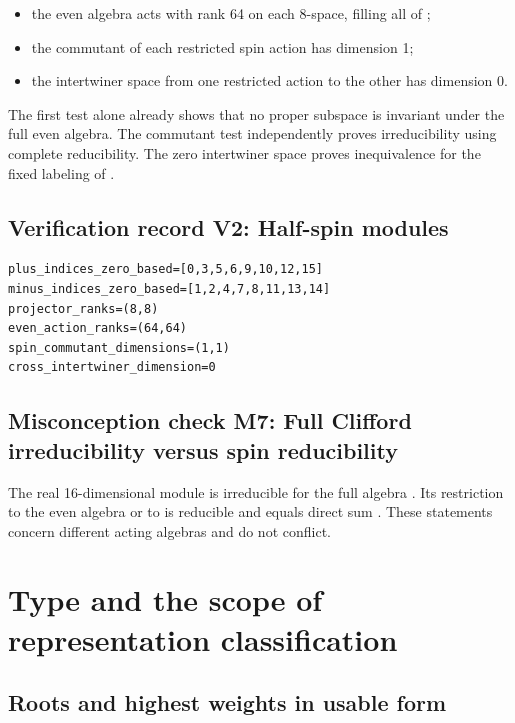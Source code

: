 \documentclass[11pt]{article}
\begin{document}
\begin{itemize}
\item the even algebra acts with rank 64 on each 8-space, filling all of
\texttt{};

\item the commutant of each restricted spin action has dimension 1;
\item the intertwiner space from one restricted action to the other has dimension
0.

\end{itemize}

The first test alone already shows that no proper subspace is invariant under the full even algebra. The commutant test independently proves irreducibility using complete reducibility. The zero intertwiner space proves inequivalence for the fixed labeling of \texttt{}.

\subsection{Verification record V2: Half-spin modules}

\begin{Verbatim}[fontsize=\small]
plus_indices_zero_based=[0,3,5,6,9,10,12,15]
minus_indices_zero_based=[1,2,4,7,8,11,13,14]
projector_ranks=(8,8)
even_action_ranks=(64,64)
spin_commutant_dimensions=(1,1)
cross_intertwiner_dimension=0
\end{Verbatim}

\subsection{Misconception check M7: Full Clifford irreducibility versus spin reducibility}

The real 16-dimensional module is irreducible for the full algebra \texttt{}. Its restriction to the even algebra or to \texttt{} is reducible and equals \texttt{} direct sum \texttt{}. These statements concern different acting algebras and do not conflict.

\section{Type \texttt{} and the scope of representation classification}

\subsection{Roots and highest weights in usable form}
\end{document}
